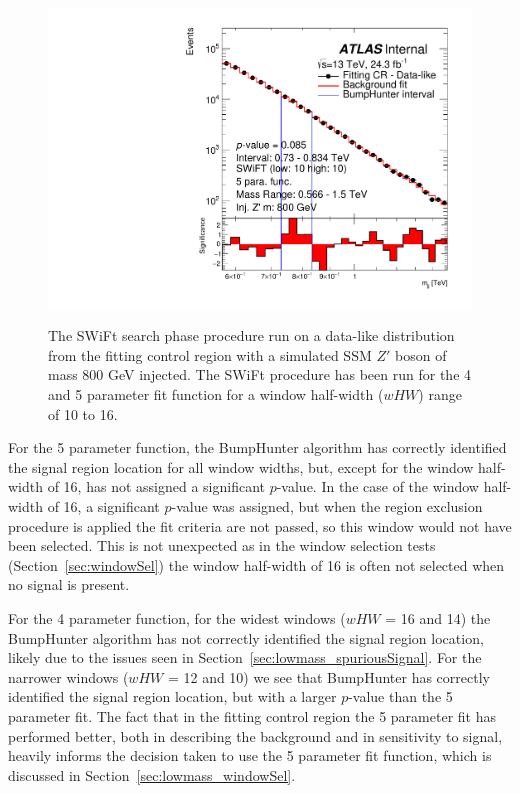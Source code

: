 \begin{figure}[!htb]
{}
 {
  \includegraphics[width=0.45\linewidth, angle=0]{figs/Dibjet/LowMass/FitStudy_min566/bhFit_corrFitCR_dataLike_5para_low10_high10_inj_Zprimebb800_xsFactor1.pdf}
}
\vspace{10pt}
\caption{\label{fig:bhFit_lm_corrFitCR_dataLike_inj_Zprimebb800_xsFactor1}
  The SWiFt search phase procedure run on a data-like distribution
  from the fitting control region with a simulated SSM $Z'$ boson of mass 800 GeV injected.
  The SWiFt procedure has been run for the 4 and 5 parameter fit function for a window half-width ($wHW$) range of 10 to 16.
}
\end{figure}

For the 5 parameter function, the {\sc BumpHunter} algorithm has correctly identified the signal region location for all window widths,
but, except for the window half-width of 16, has not assigned a significant \mbox{\mbox{$p$-value}}.
In the case of the window half-width of 16, a significant \mbox{$p$-value} was assigned,
but when the region exclusion procedure is applied the fit criteria are not passed,
so this window would not have been selected.
This is not unexpected as in the window selection tests (Section~\ref{sec:windowSel})
the window half-width of 16 is often not selected when no signal is present.

For the 4 parameter function, for the widest windows ($wHW$ = 16 and 14) the {\sc BumpHunter} algorithm has not correctly identified the signal region location,
likely due to the issues seen in Section~\ref{sec:lowmass_spuriousSignal}.
For the narrower windows ($wHW$ = 12 and 10) we see that {\sc BumpHunter} has correctly identified the signal region location,
but with a larger \mbox{$p$-value} than the 5 parameter fit.
The fact that in the fitting control region the 5 parameter fit has performed better, both in describing the background and in sensitivity to signal,
heavily informs the decision taken to use the 5 parameter fit function, which is discussed in Section~\ref{sec:lowmass_windowSel}.

